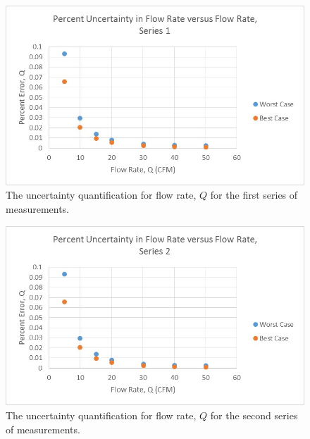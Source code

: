 \documentclass{article}
\begin{document}
  \begin{figure}[!htb]
   \begin{center}
    \includegraphics[width = 12 cm]{figs/PercentUncertaintyQVsQ_Series1.jpg}
    \caption{The uncertainty quantification for flow rate, $Q$ for the first series of measurements.}
    \label{orif-s1}
   \end{center}
  \end{figure}

  \begin{figure}[!htb]
   \begin{center}
    \includegraphics[width = 12 cm]{figs/PercentUncertaintyQVsQ_Series2.jpg}
    \caption{The uncertainty quantification for flow rate, $Q$ for the second series of measurements.}
    \label{orif-s2}
   \end{center}
  \end{figure}

%
%
%
\end{document}
